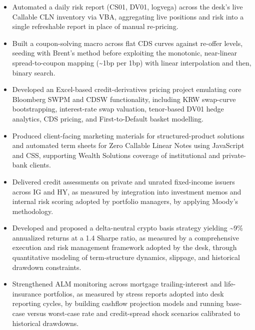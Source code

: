 \documentclass{article}
\begin{document}
\begin{itemize}
  \item Automated a daily risk report (CS01, DV01, logvega) across the desk's live Callable CLN inventory via VBA, aggregating live positions and risk into a single refreshable report in place of manual re-pricing.
  \item Built a coupon-solving macro across flat CDS curves against re-offer levels, seeding with Brent's method before exploiting the monotonic, near-linear spread-to-coupon mapping (\textasciitilde{}1bp per 1bp) with linear interpolation and then, binary search.
  \item Developed an Excel-based credit-derivatives pricing project emulating core Bloomberg SWPM and CDSW functionality, including KRW swap-curve bootstrapping, interest-rate swap valuation, tenor-based DV01 hedge analytics, CDS pricing, and First-to-Default basket modelling.
  \item Produced client-facing marketing materials for structured-product solutions and automated term sheets for Zero Callable Linear Notes using JavaScript and CSS, supporting Wealth Solutions coverage of institutional and private-bank clients.
\end{itemize}
\entrygap
{}
\begin{itemize}
  \item Delivered credit assessments on private and unrated fixed-income issuers across IG and HY, as measured by integration into investment memos and internal risk scoring adopted by portfolio managers, by applying Moody's methodology.
  \item Developed and proposed a delta-neutral crypto basis strategy yielding \textasciitilde{}9\% annualized returns at a 1.4 Sharpe ratio, as measured by a comprehensive execution and risk management framework adopted by the desk, through quantitative modeling of term-structure dynamics, slippage, and historical drawdown constraints.
  \item Strengthened ALM monitoring across mortgage trailing-interest and life-insurance portfolios, as measured by stress reports adopted into desk reporting cycles, by building cashflow projection models and running base-case versus worst-case rate and credit-spread shock scenarios calibrated to historical drawdowns.
\end{itemize}
\end{document}
